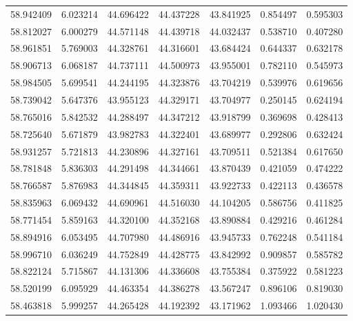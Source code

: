 \begin{tabular}{rrrrrrr}
 58.942409 &   6.023214 &         44.696422 &         44.437228 &         43.841925 &  0.854497 &  0.595303 \\
 58.812027 &   6.000279 &         44.571148 &         44.439718 &         44.032437 &  0.538710 &  0.407280 \\
 58.961851 &   5.769003 &         44.328761 &         44.316601 &         43.684424 &  0.644337 &  0.632178 \\
 58.906713 &   6.068187 &         44.737111 &         44.500973 &         43.955001 &  0.782110 &  0.545973 \\
 58.984505 &   5.699541 &         44.244195 &         44.323876 &         43.704219 &  0.539976 &  0.619656 \\
 58.739042 &   5.647376 &         43.955123 &         44.329171 &         43.704977 &  0.250145 &  0.624194 \\
 58.765016 &   5.842532 &         44.288497 &         44.347212 &         43.918799 &  0.369698 &  0.428413 \\
 58.725640 &   5.671879 &         43.982783 &         44.322401 &         43.689977 &  0.292806 &  0.632424 \\
 58.931257 &   5.721813 &         44.230896 &         44.327161 &         43.709511 &  0.521384 &  0.617650 \\
 58.781848 &   5.836303 &         44.291498 &         44.344661 &         43.870439 &  0.421059 &  0.474222 \\
 58.766587 &   5.876983 &         44.344845 &         44.359311 &         43.922733 &  0.422113 &  0.436578 \\
 58.835963 &   6.069432 &         44.690961 &         44.516030 &         44.104205 &  0.586756 &  0.411825 \\
 58.771454 &   5.859163 &         44.320100 &         44.352168 &         43.890884 &  0.429216 &  0.461284 \\
 58.894916 &   6.053495 &         44.707980 &         44.486916 &         43.945733 &  0.762248 &  0.541184 \\
 58.996710 &   6.036249 &         44.752849 &         44.428775 &         43.842992 &  0.909857 &  0.585782 \\
 58.822124 &   5.715867 &         44.131306 &         44.336608 &         43.755384 &  0.375922 &  0.581223 \\
 58.520199 &   6.095929 &         44.463354 &         44.386278 &         43.567247 &  0.896106 &  0.819030 \\
 58.463818 &   5.999257 &         44.265428 &         44.192392 &         43.171962 &  1.093466 &  1.020430 \\

\end{tabular}
